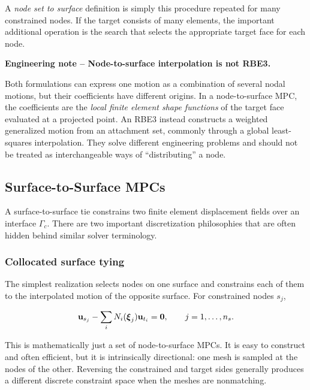 A \textit{node set to surface} definition is simply this procedure repeated for
many constrained nodes. If the target consists of many elements, the important
additional operation is the search that selects the appropriate target face for
each node.

\begin{bbox}
\textbf{Engineering note -- Node-to-surface interpolation is not RBE3.}

Both formulations can express one motion as a combination of several nodal
motions, but their coefficients have different origins. In a node-to-surface
MPC, the coefficients are the \textit{local finite element shape functions} of
the target face evaluated at a projected point. An RBE3 instead constructs a
weighted generalized motion from an attachment set, commonly through a global
least-squares interpolation. They solve different engineering problems and
should not be treated as interchangeable ways of ``distributing'' a node.
\end{bbox}

\subsection{Surface-to-Surface MPCs}\label{sec:mfc-surface-to-surface}

A surface-to-surface tie constrains two finite element displacement fields over
an interface $\Gamma_c$. There are two important discretization philosophies
that are often hidden behind similar solver terminology.

\subsubsection{Collocated surface tying}

The simplest realization selects nodes on one surface and constrains each of
them to the interpolated motion of the opposite surface. For constrained nodes
$s_j$,

\begin{equation}\label{mfc-collocated-surface-tie}
    \mathbf{u}_{s_j}
    -\sum_i
    N_i(\boldsymbol\xi_j)\mathbf{u}_{t_i}
    =\mathbf{0},
    \qquad j=1,\ldots,n_s.
\end{equation}

This is mathematically just a set of node-to-surface MPCs. It is easy to
construct and often efficient, but it is intrinsically directional: one mesh is
sampled at the nodes of the other. Reversing the constrained and target sides
generally produces a different discrete constraint space when the meshes are
nonmatching.

